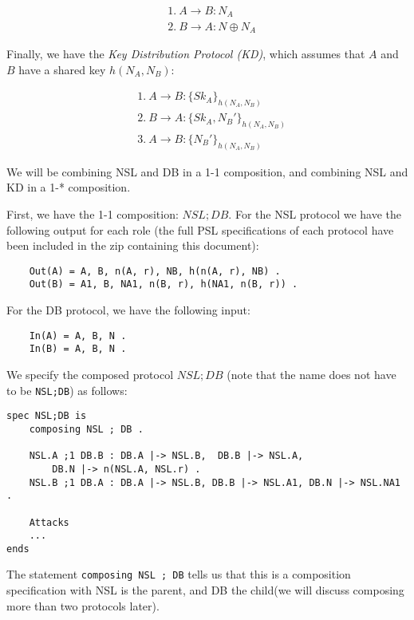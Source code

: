 \documentclass{article}
\begin{document}
\begin{align*}
    &1.~A \rightarrow B : N_A\\
    &2.~B \rightarrow A : N \oplus N_A
\end{align*}

Finally, we have the \textit{Key Distribution Protocol (KD)}, which
assumes that $A$ and $B$ have a shared key $h(N_A, N_B)$:

\begin{align*}
    &1.~A \rightarrow B : \{Sk_A\}_{h(N_A, N_B)}\\
    &2.~B \rightarrow A : \{Sk_A, N_B'\}_{h(N_A, N_B)}\\
    &3.~A \rightarrow B : \{N_B'\}_{h(N_A,N_B)}
\end{align*}

We will be combining NSL and DB in a 1-1 composition, and combining
NSL and KD in a 1-* composition.

First, we have the 1-1 composition: $\mathit{NSL} ; \mathit{DB}$. 
For the NSL protocol we have the following output for each
role (the full PSL specifications
of each protocol have been included in the zip containing this document):

\begin{verbatim}
    Out(A) = A, B, n(A, r), NB, h(n(A, r), NB) .
    Out(B) = A1, B, NA1, n(B, r), h(NA1, n(B, r)) .
\end{verbatim}

For the DB protocol, we have the following input:

\begin{verbatim}
    In(A) = A, B, N .
    In(B) = A, B, N .
\end{verbatim}

We specify the composed protocol $\mathit{NSL};\mathit{DB}$ (note that
the name does not have to be \verb|NSL;DB|) as follows:
\begin{verbatim}
spec NSL;DB is 
    composing NSL ; DB .

    NSL.A ;1 DB.B : DB.A |-> NSL.B,  DB.B |-> NSL.A, 
        DB.N |-> n(NSL.A, NSL.r) .
    NSL.B ;1 DB.A : DB.A |-> NSL.B, DB.B |-> NSL.A1, DB.N |-> NSL.NA1 . 

    Attacks        
    ...
ends
\end{verbatim}



The statement \verb|composing NSL ; DB| 
tells us that this is a composition specification with NSL is the parent,
and DB the child(we will discuss composing more than two 
protocols later).
\end{document}
